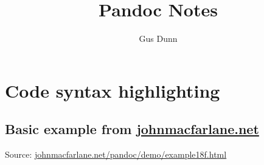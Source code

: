 \documentclass[letterpaper]{scrartcl}
\title{Pandoc Notes}
\author{Gus Dunn}
\date{}
\begin{document}
\maketitle

{
\hypersetup{linkcolor=black}
\setcounter{tocdepth}{3}
\tableofcontents
}
\section{Code syntax highlighting}\label{code-syntax-highlighting}

\subsection{Basic example from
\href{http://johnmacfarlane.net}{johnmacfarlane.net}}\label{basic-example-from-johnmacfarlane.net}

Source:
\href{http://johnmacfarlane.net/pandoc/demo/example18f.html}{johnmacfarlane.net/pandoc/demo/example18f.html}
\end{document}
